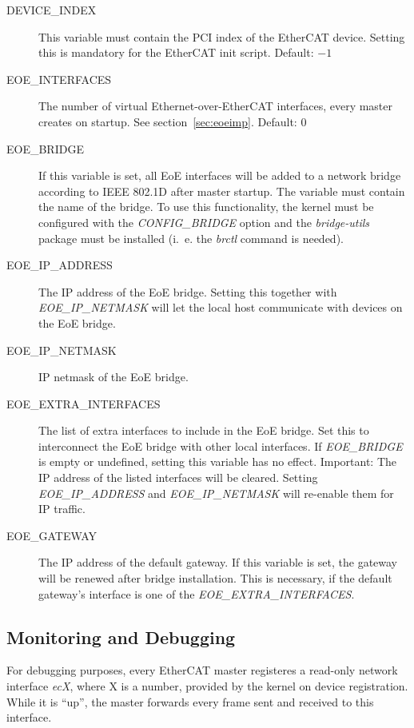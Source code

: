 \documentclass[a4paper,12pt,BCOR6mm,bibtotoc,idxtotoc]{scrbook}
\begin{document}
\begin{description}
\item[DEVICE\_INDEX] This variable must contain the PCI index of the
  EtherCAT device.  Setting this is mandatory for the EtherCAT init
  script. Default: $-1$
\item[EOE\_INTERFACES] The number of virtual Ethernet-over-EtherCAT
  interfaces, every master creates on startup. See
  section~\ref{sec:eoeimp}. Default: $0$
\item[EOE\_BRIDGE] If this variable is set, all EoE interfaces will be
  added to a network bridge according to IEEE 802.1D after master
  startup. The variable must contain the name of the bridge. To use
  this functionality, the kernel must be configured with the
  \textit{CONFIG\_BRIDGE} option and the \textit{bridge-utils} package
  must be installed (i.~e. the \textit{brctl} command is needed).
\item[EOE\_IP\_ADDRESS] The IP address of the EoE bridge. Setting this
  together with \textit{EOE\_IP\_NETMASK} will let the local host
  communicate with devices on the EoE bridge.
\item[EOE\_IP\_NETMASK] IP netmask of the EoE bridge.
\item[EOE\_EXTRA\_INTERFACES] The list of extra interfaces to include
  in the EoE brid\-ge. Set this to interconnect the EoE bridge with
  other local interfaces. If \textit{EOE\_\-BRIDGE} is empty or
  undefined, setting this variable has no effect. Important: The IP
  address of the listed interfaces will be cleared. Setting
  \textit{EOE\_\-IP\_\-ADDRESS} and \textit{EOE\_IP\_NETMASK} will
  re-enable them for IP traffic.
\item[EOE\_GATEWAY] The IP address of the default gateway. If this
  variable is set, the gateway will be renewed after bridge
  installation. This is necessary, if the default gateway's interface
  is one of the \textit{EOE\_EXTRA\_INTERFACES}.
\end{description}


\subsection{Monitoring and Debugging}
\label{sec:debug}

For debugging purposes, every EtherCAT master registeres a read-only
network interface \textit{ecX}, where X is a number, provided by the
kernel on device registration. While it is ``up'', the master forwards
every frame sent and received to this interface.
\end{document}
